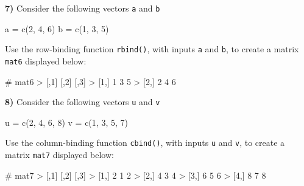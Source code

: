 \documentclass[
]{book}
\newenvironment{Shaded}{\begin{snugshade}}{\end{snugshade}}
\newcommand{\DecValTok}[1]{\textcolor[rgb]{0.00,0.00,0.81}{#1}}
\newcommand{\FunctionTok}[1]{\textcolor[rgb]{0.00,0.00,0.00}{#1}}
\newcommand{\NormalTok}[1]{#1}
\newcommand{\OtherTok}[1]{\textcolor[rgb]{0.56,0.35,0.01}{#1}}
\begin{document}
\textbf{7)} Consider the following vectors \texttt{a} and \texttt{b}

\begin{Shaded}
\begin{Highlighting}[]
\NormalTok{a }\OtherTok{=} \FunctionTok{c}\NormalTok{(}\DecValTok{2}\NormalTok{, }\DecValTok{4}\NormalTok{, }\DecValTok{6}\NormalTok{)}
\NormalTok{b }\OtherTok{=} \FunctionTok{c}\NormalTok{(}\DecValTok{1}\NormalTok{, }\DecValTok{3}\NormalTok{, }\DecValTok{5}\NormalTok{)}
\end{Highlighting}
\end{Shaded}

Use the row-binding function \texttt{rbind()}, with inputs \texttt{a} and \texttt{b}, to create a
matrix \texttt{mat6} displayed below:

\begin{Shaded}
\begin{Highlighting}[]
\NormalTok{\# mat6}
\NormalTok{\textgreater{}      [,1] [,2] [,3]}
\NormalTok{\textgreater{} [1,]    1    3    5}
\NormalTok{\textgreater{} [2,]    2    4    6}
\end{Highlighting}
\end{Shaded}

\textbf{8)} Consider the following vectors \texttt{u} and \texttt{v}

\begin{Shaded}
\begin{Highlighting}[]
\NormalTok{u }\OtherTok{=} \FunctionTok{c}\NormalTok{(}\DecValTok{2}\NormalTok{, }\DecValTok{4}\NormalTok{, }\DecValTok{6}\NormalTok{, }\DecValTok{8}\NormalTok{)}
\NormalTok{v }\OtherTok{=} \FunctionTok{c}\NormalTok{(}\DecValTok{1}\NormalTok{, }\DecValTok{3}\NormalTok{, }\DecValTok{5}\NormalTok{, }\DecValTok{7}\NormalTok{)}
\end{Highlighting}
\end{Shaded}

Use the column-binding function \texttt{cbind()}, with inputs \texttt{u} and \texttt{v}, to create
a matrix \texttt{mat7} displayed below:

\begin{Shaded}
\begin{Highlighting}[]
\NormalTok{\# mat7}
\NormalTok{\textgreater{}      [,1] [,2] [,3]}
\NormalTok{\textgreater{} [1,]    2    1    2}
\NormalTok{\textgreater{} [2,]    4    3    4}
\NormalTok{\textgreater{} [3,]    6    5    6}
\NormalTok{\textgreater{} [4,]    8    7    8}
\end{Highlighting}
\end{Shaded}
\end{document}
